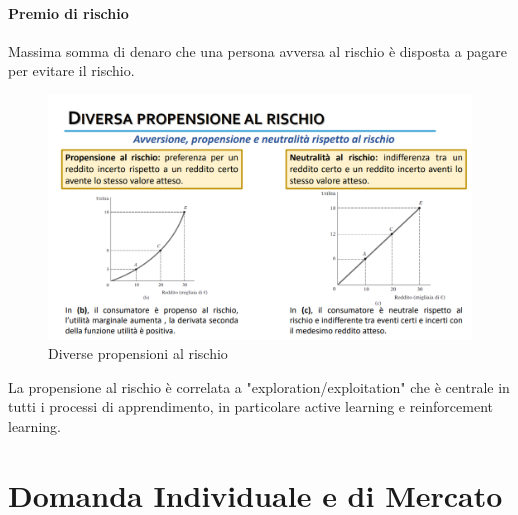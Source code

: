 \documentclass[12pt]{article}
\begin{document}
\paragraph{Premio di rischio} Massima somma di denaro che una persona avversa al rischio è disposta a pagare per evitare il rischio.
\FloatBarrier
\begin{figure}[!htb]
    \centering
    \includegraphics[width=1\textwidth]{images/propRischio.png}
    \caption{Diverse propensioni al rischio}
\end{figure}
\FloatBarrier
La propensione al rischio è correlata a "exploration/exploitation" che
è centrale in tutti i processi di apprendimento, in particolare active
learning e reinforcement learning.
\newpage
\section{Domanda Individuale e di Mercato}
\end{document}
